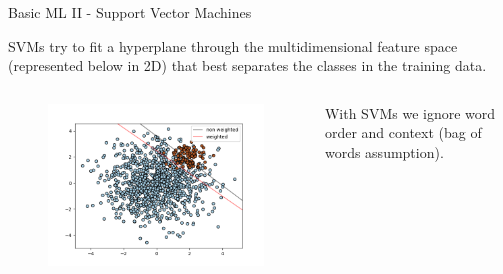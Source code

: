 \documentclass[9pt]{beamer}
\begin{document}
\begin{frame}{Basic ML II - Support Vector Machines}

SVMs try to fit a hyperplane through the multidimensional feature space (represented below in 2D) that best separates the classes in the training data.

\begin{columns}
\begin{column}{0.618\linewidth}
	\begin{figure}
		\includegraphics[width=\linewidth]{images/svc_sklearn_unbalanced.png}
	\end{figure}
\end{column}
\begin{column}{0.382\linewidth}
	With SVMs we ignore word order and context (bag of words assumption).
\end{column}
\end{columns}

\end{frame}
\end{document}
